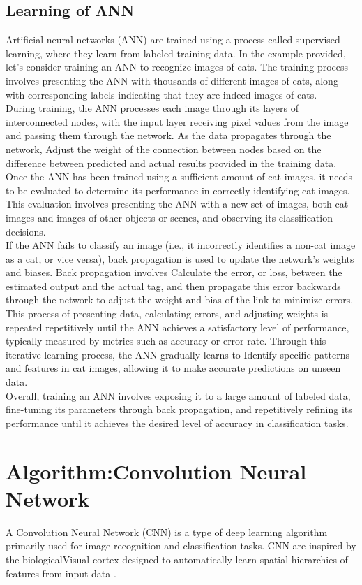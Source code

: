 \subsection{Learning of ANN}
Artificial neural networks (ANN) are trained using a process called supervised learning, where they learn from labeled training data. In the example provided, let's consider training an ANN to recognize images of cats. The training process involves presenting the ANN with thousands of different images of cats, along with corresponding labels indicating that they are indeed images of cats.
\\
During training, the ANN processes each image through its layers of interconnected nodes, with the input layer receiving pixel values from the image and passing them through the network. As the data propagates through the network, Adjust the weight of the connection between nodes based on the difference between predicted and actual results provided in the training data.
\\
Once the ANN has been trained using a sufficient amount of cat images, it needs to be evaluated to determine its performance in correctly identifying cat images. This evaluation involves presenting the ANN with a new set of images, both cat images and images of other objects or scenes, and observing its classification decisions.
\\
If the ANN fails to classify an image (i.e., it incorrectly identifies a non-cat image as a cat, or vice versa), back propagation is used to update the network's weights and biases. Back propagation involves Calculate the error, or loss, between the estimated output and the actual tag, and then propagate this error backwards through the network to adjust the weight and bias of the link to minimize errors.
\\
This process of presenting data, calculating errors, and adjusting weights is repeated repetitively until the ANN achieves a satisfactory level of performance, typically measured by metrics such as accuracy or error rate. Through this iterative learning process, the ANN gradually learns to Identify specific patterns and features in cat images, allowing it to make accurate predictions on unseen data.
\\
Overall, training an ANN involves exposing it to a large amount of labeled data, fine-tuning its parameters through back propagation, and repetitively refining its performance until it achieves the desired level of accuracy in classification tasks.
\section{Algorithm:Convolution Neural Network}
A Convolution Neural Network (CNN) is a type of deep learning algorithm primarily used for image recognition and classification tasks. CNN are inspired by the biologicalVisual cortex designed to automatically learn spatial hierarchies of features from input data \cite{wang2020cnn}.

